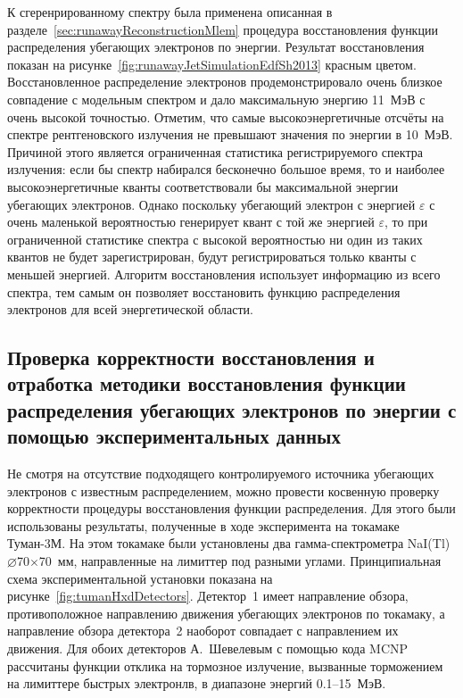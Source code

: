К сгеренрированному спектру была применена описанная в разделе~\ref{sec:runawayReconstructionMlem} процедура восстановления функции распределения убегающих электронов по энергии. Результат восстановления показан на рисунке~\ref{fig:runawayJetSimulationEdfSh2013} красным цветом. Восстановленное распределение электронов продемонстрировало очень близкое совпадение с модельным спектром и дало максимальную энергию 11~МэВ с очень высокой точностью. Отметим, что самые высокоэнергетичные отсчёты на спектре рентгеновского излучения не превышают значения по энергии в 10~МэВ. Причиной этого является ограниченная статистика регистрируемого спектра излучения: если бы спектр набирался бесконечно большое время, то и наиболее высокоэнергетичные кванты соответствовали бы максимальной энергии убегающих электронов. Однако поскольку убегающий электрон с энергией $\varepsilon$ с очень маленькой вероятностью генерирует квант с той же энергией $\varepsilon$, то при ограниченной статистике спектра с высокой вероятностью ни один из таких квантов не будет зарегистрирован, будут регистрироваться только кванты с меньшей энергией. Алгоритм восстановления использует информацию из всего спектра, тем самым он позволяет восстановить функцию распределения электронов для всей энергетической области.~\cite{Shevelev2013}


\subsection{ Проверка корректности восстановления и отработка методики восстановления функции распределения убегающих электронов по энергии с помощью экспериментальных данных }

Не смотря на отсутствие подходящего контролируемого источника убегающих электронов с известным распределением, можно провести косвенную проверку корректности процедуры восстановления функции распределения. Для этого были использованы результаты, полученные в ходе эксперимента на токамаке Туман-3М. На этом токамаке были установлены два гамма-спектрометра NaI(Tl) $\varnothing$70$\times$70~мм, направленные на лимиттер под разными углами. Принципиальная схема экспериментальной установки показана на рисунке~\ref{fig:tumanHxdDetectors}. Детектор~1 имеет направление обзора, противоположное направлению движения убегающих электронов по токамаку, а направление обзора детектора~2 наоборот совпадает с направлением их движения. Для обоих детекторов А.~Шевелевым с помощью кода MCNP рассчитаны функции отклика на тормозное излучение, вызванные торможением на лимиттере быстрых электронлв, в диапазоне энергий 0.1--15~МэВ.~\cite{Shevelev2013} 

